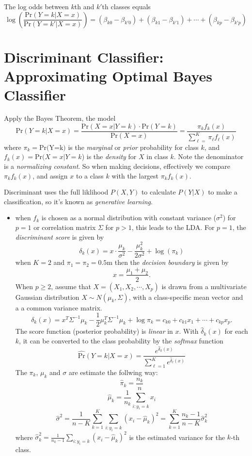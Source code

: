\documentclass[
  letterpaper,
  DIV=11,
  numbers=noendperiod]{scrreprt}
\providecommand{\tightlist}{%
  \setlength{\itemsep}{0pt}\setlength{\parskip}{0pt}}\usepackage{longtable,booktabs,array}
\begin{document}
The log odds between \(k\)th and \(k'\)th classes equals \[
\log(\frac{\text{Pr}(Y=k|X=x)}{\text{Pr}(Y=k'|X=x)})=(\beta_{k0}-\beta_{k'0}) + (\beta_{k1}-\beta_{k'1}) + \cdots + (\beta_{kp}-\beta_{k'p})\]

\section{Discriminant Classifier: Approximating Optimal Bayes
Classifier}\label{discriminant-classifier-approximating-optimal-bayes-classifier}

Apply the Bayes Theorem, the model \[
\text{Pr}(Y=k|X=x)=\frac{\text{Pr}(X=x|Y=k)\cdot \text{Pr}(Y=k)}{\text{Pr}(X=x)}=\frac{\pi_k f_k(x)}{\sum_{\ell =}^ K \pi_{\ell}f_\ell(x)}
\] where \(\pi_k=\text{Pr(Y=k)}\) is the \emph{marginal} or \emph{prior}
probability for class \(k\), and \(f_k(x)=\text{Pr}(X=x|Y=k\)) is the
\emph{density} for \(X\) in class \(k\). Note the denominator is a
\emph{normalizing constant}. So when making decisions, effectively we
compare \(\pi_kf_k(x)\), and assign \(x\) to a class \(k\) with the
largest \(\pi_kf_k(x)\).

Discriminant uses the full liklihood \(P(X,Y)\) to calculate \(P(Y|X)\)
to make a classification, so it's known as \emph{generative learning}.

\begin{itemize}
\tightlist
\item
  when \(f_k\) is chosen as a normal distribution with constant variance
  (\(\sigma^2\)) for \(p=1\) or correlation matrix \(\Sigma\) for
  \(p>1\), this leads to the LDA. For \(p=1\), the \emph{discriminant
  score} is given by \[
  \delta_k(x) = x\cdot \frac{\mu_k}{\sigma^2}-\frac{\mu_k^2}{2\sigma^2}+\log (\pi_k)
  \] when \(K=2\) and \(\pi_1=\pi_2=0.5\)m then the \emph{decision
  boundary} is given by \[
  x=\frac{\mu_1+\mu_2}{2}. 
  \] When \(p\ge 2\), assume that \(X=(X_1, X_2, \cdots, X_p)\) is drawn
  from a multivariate Gaussian distribution \(X \sim N(\mu_k, \Sigma)\),
  with a class-specific mean vector and a a common variance matrix. \[
  \delta_k(x) =x^T\Sigma^{-1}\mu_k-\frac{1}{2}\mu_k^T\Sigma^{-1}\mu_k +\log \pi_k=c_{k0}+c_{k1}x_1+\cdots +c_{kp}x_p.
  \] The score function (posterior probability) is \emph{linear} in
  \(x\). With \(\hat{\delta}_k(x)\) for each \(k\), it can be converted
  to the class probability by the \emph{softmax} function \[
  \hat{\text{Pr}}(Y=k|X=x)=\frac{e^{\hat{\delta}_k(x)}}{\sum_{\ell=1}^K e^{\hat{\delta}_{\ell}(x)}}
  \] The \(\pi_k\), \(\mu_k\) and \(\sigma\) are estimate the follwing
  way: \[
  \hat{\pi}_k =\frac{n_k}{n}
  \] \[
  \hat{\mu}_k = \frac{1}{n_k} \sum_{i:y_i=k} x_i
  \] \[
  \hat{\sigma}^2 = \frac{1}{n-K}\sum_{k=1}^K \sum_{i:y_i=k}(x_i-\hat{\mu}_k)^2=\sum_{k=1}^{K}\frac{n_k-1}{n-K}\hat{\sigma}^2_k
  \] where
  \(\hat{\sigma}_k^2=\frac{1}{n_k-1} \sum_{i:y_i=k}(x_i-\hat{\mu}_k)^2\)
  is the estimated variance for the \(k\)-th class.
\end{itemize}
\end{document}

